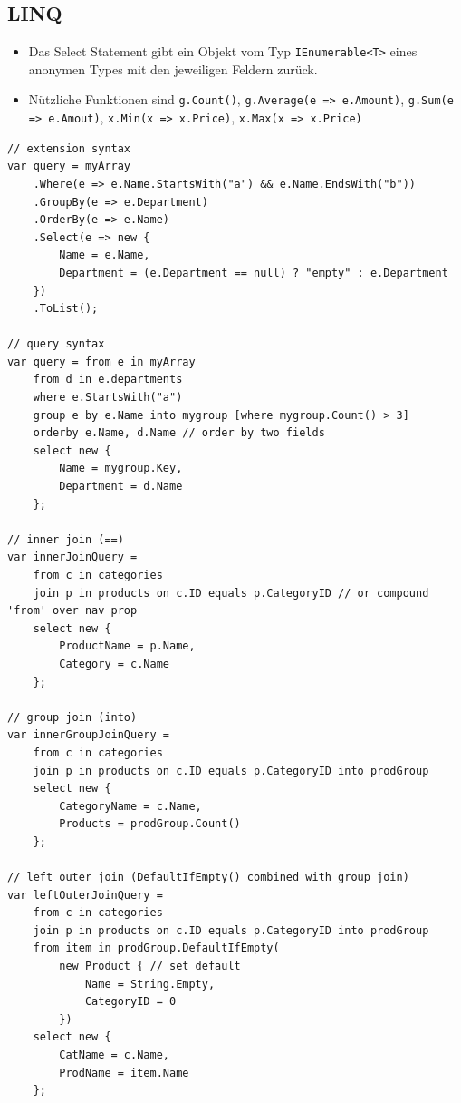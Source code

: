 \documentclass[
a4paper,
oneside,
10pt,
fleqn,
headsepline,
toc=listofnumbered, 
bibliography=totocnumbered]{scrartcl}
\begin{document}
\subsection{LINQ}
\begin{itemize}
	\item Das Select Statement gibt ein Objekt vom Typ \lstinline|IEnumerable<T>| eines anonymen Types mit den jeweiligen Feldern zurück.
	\item Nützliche Funktionen sind \lstinline|g.Count()|, \lstinline|g.Average(e => e.Amount)|, \lstinline|g.Sum(e => e.Amout)|, \lstinline|x.Min(x => x.Price)|, \lstinline|x.Max(x => x.Price)|
\end{itemize}
\begin{lstlisting}
// extension syntax
var query = myArray
	.Where(e => e.Name.StartsWith("a") && e.Name.EndsWith("b"))
	.GroupBy(e => e.Department)
	.OrderBy(e => e.Name)
	.Select(e => new {
		Name = e.Name,
		Department = (e.Department == null) ? "empty" : e.Department
	})
	.ToList();

// query syntax
var query = from e in myArray
	from d in e.departments
	where e.StartsWith("a")
	group e by e.Name into mygroup [where mygroup.Count() > 3]
	orderby e.Name, d.Name // order by two fields
	select new {
		Name = mygroup.Key,
		Department = d.Name
	};
	
// inner join (==)
var innerJoinQuery =
    from c in categories
    join p in products on c.ID equals p.CategoryID // or compound 'from' over nav prop
    select new { 
	    ProductName = p.Name, 
	    Category = c.Name 
	};
	
// group join (into)
var innerGroupJoinQuery =
    from c in categories
    join p in products on c.ID equals p.CategoryID into prodGroup
    select new { 
	    CategoryName = c.Name, 
	    Products = prodGroup.Count()
	};
	
// left outer join (DefaultIfEmpty() combined with group join)
var leftOuterJoinQuery =
    from c in categories
    join p in products on c.ID equals p.CategoryID into prodGroup
    from item in prodGroup.DefaultIfEmpty(
	    new Product { // set default
		    Name = String.Empty, 
		    CategoryID = 0 
		})
    select new { 
	    CatName = c.Name, 
	    ProdName = item.Name 
	};
\end{lstlisting}

\clearpage
\end{document}
